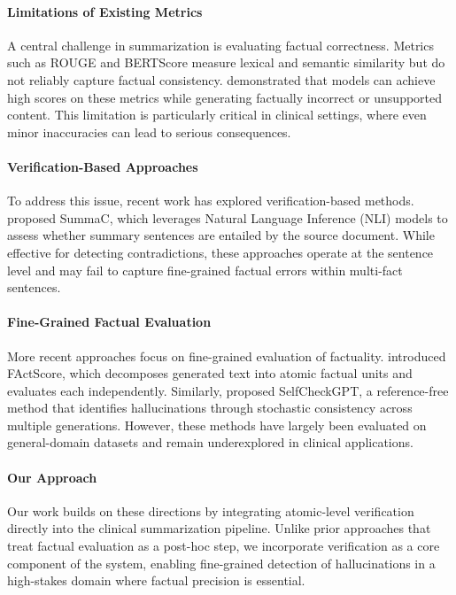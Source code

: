 \documentclass[11pt]{article}
\begin{document}
\paragraph{Limitations of Existing Metrics}
A central challenge in summarization is evaluating factual correctness. Metrics such as ROUGE \cite{lin2004rouge} and BERTScore \cite{zhang2020bertscore} measure lexical and semantic similarity but do not reliably capture factual consistency. \citet{maynez2020faithfulness} demonstrated that models can achieve high scores on these metrics while generating factually incorrect or unsupported content. This limitation is particularly critical in clinical settings, where even minor inaccuracies can lead to serious consequences.

\paragraph{Verification-Based Approaches}
To address this issue, recent work has explored verification-based methods. \citet{laban2022summac} proposed SummaC, which leverages Natural Language Inference (NLI) models to assess whether summary sentences are entailed by the source document. While effective for detecting contradictions, these approaches operate at the sentence level and may fail to capture fine-grained factual errors within multi-fact sentences.

\paragraph{Fine-Grained Factual Evaluation}
More recent approaches focus on fine-grained evaluation of factuality. \citet{min2023factscore} introduced FActScore, which decomposes generated text into atomic factual units and evaluates each independently. Similarly, \citet{manakul2023selfcheckgpt} proposed SelfCheckGPT, a reference-free method that identifies hallucinations through stochastic consistency across multiple generations. However, these methods have largely been evaluated on general-domain datasets and remain underexplored in clinical applications.

\paragraph{Our Approach}
Our work builds on these directions by integrating atomic-level verification directly into the clinical summarization pipeline. Unlike prior approaches that treat factual evaluation as a post-hoc step, we incorporate verification as a core component of the system, enabling fine-grained detection of hallucinations in a high-stakes domain where factual precision is essential.
\end{document}
